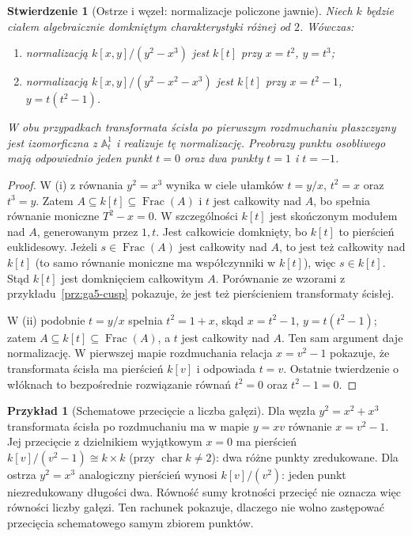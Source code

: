 \documentclass[11pt,a4paper,openany]{report}
\numberwithin{equation}{section}
\theoremstyle{plain}
\newtheorem{stwierdzenie}[twierdzenie]{Stwierdzenie}
\theoremstyle{definition}
\newtheorem{przyklad}[twierdzenie]{Przykład}
\theoremstyle{remark}
\newcommand{\A}{\mathbb A}
\newcommand{\Frac}{\operatorname{Frac}}
\begin{document}
\begin{stwierdzenie}[Ostrze i węzeł: normalizacje policzone jawnie]
\label{st:ga5-normalization}
Niech $k$ będzie ciałem algebraicznie domkniętym
charakterystyki różnej od $2$. Wówczas:
\begin{enumerate}[label=(\roman*)]
\item normalizacją $k[x,y]/(y^2-x^3)$ jest $k[t]$
przy $x=t^2$, $y=t^3$;
\item normalizacją $k[x,y]/(y^2-x^2-x^3)$ jest
$k[t]$ przy $x=t^2-1$, $y=t(t^2-1)$.
\end{enumerate}
W obu przypadkach transformata ścisła po pierwszym
rozdmuchaniu płaszczyzny jest izomorficzna z $\A^1_t$
i realizuje tę normalizację. Preobrazy punktu osobliwego
mają odpowiednio jeden punkt $t=0$ oraz dwa punkty
$t=1$ i $t=-1$.
\end{stwierdzenie}
\begin{proof}
W (i) z równania $y^2=x^3$ wynika w ciele ułamków
$t=y/x$, $t^2=x$ oraz $t^3=y$. Zatem
$A\subseteq k[t]\subseteq\Frac(A)$ i $t$ jest całkowity
nad $A$, bo spełnia równanie moniczne $T^2-x=0$.
W szczególności $k[t]$ jest skończonym modułem nad
$A$, generowanym przez $1,t$. Jest całkowicie
domknięty, bo $k[t]$ to pierścień euklidesowy.
Jeżeli $s\in\Frac(A)$ jest całkowity nad $A$, to jest
też całkowity nad $k[t]$ (to samo równanie moniczne
ma współczynniki w $k[t]$), więc $s\in k[t]$.
Stąd $k[t]$ jest domknięciem całkowitym $A$.
Porównanie ze wzorami z przykładu~\ref{prz:ga5-cusp}
pokazuje, że jest też pierścieniem transformaty ścisłej.

W (ii) podobnie $t=y/x$ spełnia $t^2=1+x$,
skąd $x=t^2-1$, $y=t(t^2-1)$; zatem
$A\subseteq k[t]\subseteq\Frac(A)$, a $t$ jest
całkowity nad $A$. Ten sam argument daje normalizację.
W pierwszej mapie rozdmuchania relacja
$x=v^2-1$ pokazuje, że transformata ścisła ma
pierścień $k[v]$ i odpowiada $t=v$.
Ostatnie twierdzenie o włóknach to bezpośrednie
rozwiązanie równań $t^2=0$ oraz $t^2-1=0$.
\end{proof}

\begin{przyklad}[Schematowe przecięcie a liczba gałęzi]
Dla węzła $y^2=x^2+x^3$ transformata ścisła po
rozdmuchaniu ma w mapie $y=xv$ równanie
$x=v^2-1$. Jej przecięcie z dzielnikiem wyjątkowym
$x=0$ ma pierścień $k[v]/(v^2-1)\cong k\times k$
(przy $\operatorname{char}k\ne2$): dwa różne punkty
zredukowane. Dla ostrza $y^2=x^3$ analogiczny
pierścień wynosi $k[v]/(v^2)$: jeden punkt
niezredukowany długości dwa. Równość sumy krotności
przecięć nie oznacza więc równości liczby gałęzi.
Ten rachunek pokazuje, dlaczego nie wolno zastępować
przecięcia schematowego samym zbiorem punktów.
\end{przyklad}
\end{document}
